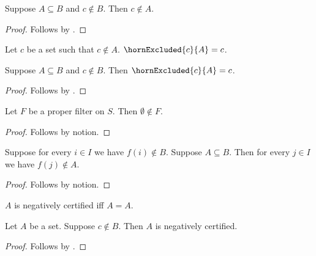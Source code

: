 


\begin{classification}\label{horn_not_in_subset}
    Suppose $A\subseteq B$ and $c\notin B$.
    Then $c\notin A$.
\end{classification}
\begin{proof}
    Follows by .
\end{proof}

\begin{definition}\label{horn_exclusion_contract}
    Let $c$ be a set such that $c\notin A$.
    $\hornExcluded{c}{A}=c$.
\end{definition}

\begin{proposition}\label{horn_exclusion_consumer}
    Suppose $A\subseteq B$ and $c\notin B$.
    Then $\hornExcluded{c}{A}=c$.
\end{proposition}
\begin{proof}
    Follows by .
\end{proof}

\begin{proposition}\label{horn_proper_filter_negative}
    Let $F$ be a proper filter on $S$.
    Then $\emptyset\notin F$.
\end{proposition}
\begin{proof}
    Follows by notion.
\end{proof}

\begin{proposition}\label{horn_indexed_negative}
    Suppose for every $i\in I$ we have $f(i)\notin B$.
    Suppose $A\subseteq B$.
    Then for every $j\in I$ we have $f(j)\notin A$.
\end{proposition}
\begin{proof}
    Follows by notion.
\end{proof}

\begin{definition}\label{horn_negative_certified}
    $A$ is negatively certified iff $A=A$.
\end{definition}

\begin{classification}\label{horn_negative_body_witness}
    Let $A$ be a set.
    Suppose $c\notin B$.
    Then $A$ is negatively certified.
\end{classification}
\begin{proof}
    Follows by .
\end{proof}

